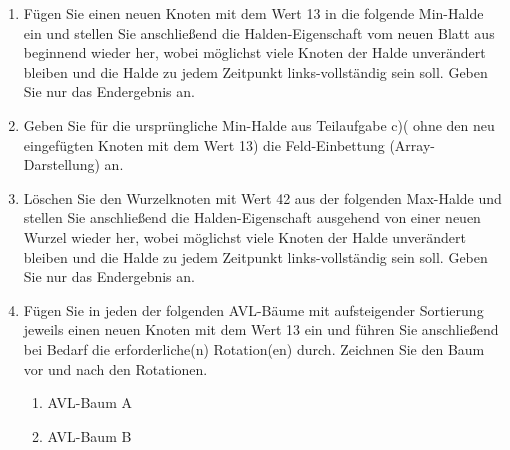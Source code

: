 \documentclass{lehramt-informatik-aufgabe}
\begin{document}
\begin{enumerate}

\item Fügen Sie einen neuen Knoten mit dem Wert 13 in die folgende
Min-Halde ein und stellen Sie anschließend die Halden-Eigenschaft vom
neuen Blatt aus beginnend wieder her, wobei möglichst viele Knoten der
Halde unverändert bleiben und die Halde zu jedem Zeitpunkt
links-vollständig sein soll. Geben Sie nur das Endergebnis an.


\item Geben Sie für die ursprüngliche Min-Halde aus Teilaufgabe c)(\dh
ohne den neu eingefügten Knoten mit dem Wert 13) die Feld-Einbettung
(Array-Darstellung) an.


\item Löschen Sie den Wurzelknoten mit Wert 42 aus der folgenden
Max-Halde und stellen Sie anschließend die Halden-Eigenschaft ausgehend
von einer neuen Wurzel wieder her, wobei möglichst viele Knoten der
Halde unverändert bleiben und die Halde zu jedem Zeitpunkt
links-vollständig sein soll. Geben Sie nur das Endergebnis an.


\item Fügen Sie in jeden der folgenden AVL-Bäume mit aufsteigender
Sortierung jeweils einen neuen Knoten mit dem Wert 13 ein und führen Sie
anschließend bei Bedarf die erforderliche(n) Rotation(en) durch.
Zeichnen Sie den Baum vor und nach den Rotationen.

\begin{enumerate}


\item AVL-Baum A


\item AVL-Baum B
\end{enumerate}
\end{enumerate}
\end{document}

